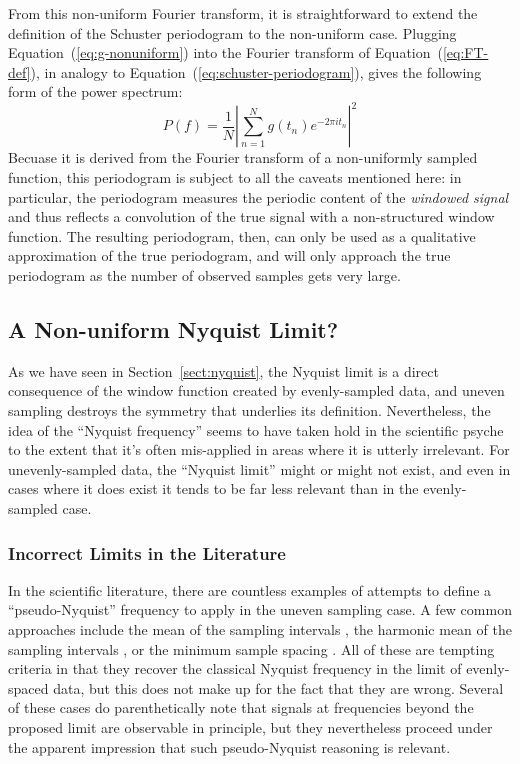 \documentclass[preprint]{aastex}
\newcommand{\Eq}[1]{Equation~(\ref{eq:#1})}
\newcommand{\eq}[1]{\Eq{#1}}
\newcommand{\Sect}[1]{Section~\ref{sect:#1}}
\newcommand{\sect}[1]{\Sect{#1}}
\newcommand{\sectlabel}[1]{\label{sect:#1}}
\begin{document}
From this non-uniform Fourier transform, it is straightforward to extend the
definition of the Schuster periodogram to the non-uniform case.
Plugging \eq{g-nonuniform} into the Fourier transform of \eq{FT-def}, in analogy to \eq{schuster-periodogram}, gives the following form of the power spectrum:
\begin{equation}
  P(f) = \frac{1}{N}\left|\sum_{n=1}^N g(t_n)e^{-2\pi i t_n} \right|^2
\end{equation}
Becuase it is derived from the Fourier transform of a non-uniformly sampled
function, this periodogram is subject to all the caveats mentioned here: in
particular, the periodogram measures the periodic content of the
{\it windowed signal} and thus reflects a convolution of the true signal
with a non-structured window function.
The resulting periodogram, then, can only be used as a qualitative approximation
of the true periodogram, and will only approach the true periodogram as the
number of observed samples gets very large.


\subsection{A Non-uniform Nyquist Limit?}
\sectlabel{pseudo-nyquist}

As we have seen in \sect{nyquist}, the Nyquist limit is a direct consequence
of the window function created by evenly-sampled data,
and uneven sampling destroys the symmetry that underlies its definition.
Nevertheless, the idea of the ``Nyquist frequency'' seems to have taken hold
in the scientific psyche to the extent that it's often mis-applied in areas
where it is utterly irrelevant.
For unevenly-sampled data, the ``Nyquist limit'' might or might not exist,
and even in cases where it does exist it tends to be far less relevant than
in the evenly-sampled case.

\subsubsection{Incorrect Limits in the Literature}

In the scientific literature, there are countless examples of attempts to
define a ``pseudo-Nyquist'' frequency to apply in the uneven sampling case.
A few common approaches include the mean of the sampling intervals
\citep[e.g.][]{Scargle82, Horne86, NumRec},
the harmonic mean of the sampling intervals \citep[e.g.][]{Debosscher07},
or the minimum sample spacing \citep[e.g.][]{Percy86, Roberts87, Press89, Hilditch01}.
All of these are tempting criteria in that they recover the classical Nyquist 
frequency in the limit of evenly-spaced data, but this does not make up for the
fact that they are wrong.
Several of these cases do parenthetically note that signals at frequencies
beyond the proposed limit are observable in principle, but they nevertheless
proceed under the apparent impression that such pseudo-Nyquist reasoning
is relevant.
\end{document}
